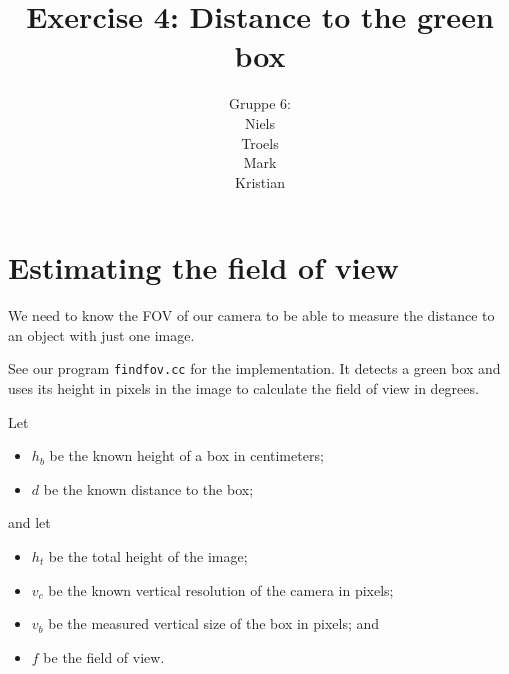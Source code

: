 \documentclass[a4paper,12pt]{article}
\title{Exercise 4: Distance to the green box}
\author{Gruppe 6:\\Niels\\Troels\\Mark\\Kristian}
\begin{document}
\maketitle

\section{Estimating the field of view}

We need to know the FOV of our camera to be able to measure the distance to an
object with just one image.

See our program \texttt{findfov.cc} for the implementation.  It detects a green
box and uses its height in pixels in the image to calculate the field of view in
degrees.

Let
\begin{itemize}
\item $h_b$ be the known height of a box in centimeters;
\item $d$ be the known distance to the box;
\end{itemize}

and let
\begin{itemize}
\item $h_t$ be the total height of the image;
\item $v_c$ be the known vertical resolution of the camera in pixels;
\item $v_b$ be the measured vertical size of the box in pixels; and
\item $f$ be the field of view.
\end{itemize}

Then we consider the triangle with sides $a$, $b$, and $c$ and angles $A$, $B$,
and $C$, and calculate $f$:

\begin{align*}
  h_t &= \frac{v_c}{v_b} \cdot h_b\\
  a &= \frac{h_t}{2}\\
  b &= d\\
  c &= \sqrt{a^2 + b^2}\\
  A &= \arcsin \frac{a}{c}\\
  f &= 2 \cdot A
\end{align*}


\section{Distance from one image}

See our library function \texttt{distance_two_pictures} in \texttt{cam.cc} for
the implementation.
\end{document}
